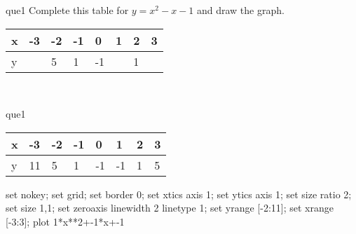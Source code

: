 \documentclass[13.5pt, varwidth=true]{beamer}
\begin{document}
\begin{frame}[shrink=19,fragile]
	\begin{beamercolorbox}[rounded=true, left, shadow=true,wd=14.8cm]{que1}
		 Complete this table for $y = x^{2} - x - 1$ and draw the graph. \\[0.3cm] \renewcommand{\arraystretch}{1.2}\begin{tabular}{|C|C|C|C|C|C|C|C|} \hline x & -3 & -2 & -1 & 0 & 1 & 2 & 3 \\ \hline y &  & 5 & 1 & -1 &  & 1 & \\ \hline \end{tabular}\\[0.3cm]
	\end{beamercolorbox}
\end{frame}
\begin{frame}[shrink=19,fragile]
	\begin{beamercolorbox}[rounded=true, left, shadow=true,wd=14.8cm]{que1}
		\renewcommand{\arraystretch}{1.2}\begin{tabular}{|C|C|C|C|C|C|C|C|} \hline x & -3 & -2 & -1 & 0 & 1 & 2 & 3 \\ \hline y & 11 & 5 & 1 & -1 & -1 & 1 & 5\\ \hline \end{tabular}\begin{gnuplot}[terminal=pdf] set nokey; set grid; set border 0; set xtics axis 1; set ytics axis 1; set size ratio 2; set size 1,1; set zeroaxis linewidth 2 linetype 1; set yrange [-2:11]; set xrange [-3:3]; plot 1*x**2+-1*x+-1 \end{gnuplot}
	\end{beamercolorbox}
\end{frame}
\end{document}
